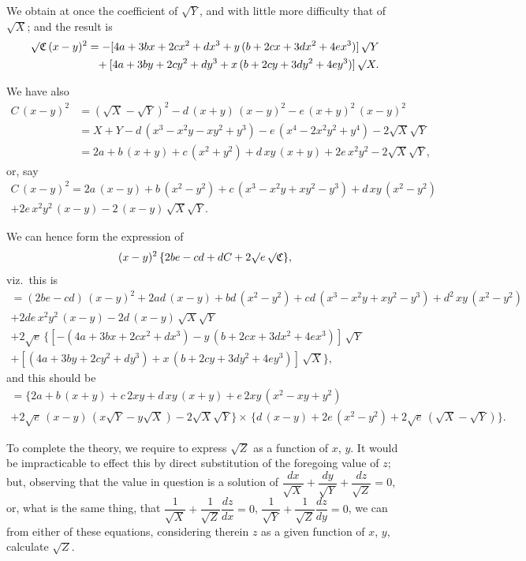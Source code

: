 \documentclass[11pt,a4paper]{book}
\begin{document}
We obtain at once the coefficient of $\surd Y$, and with little more difficulty that of $\surd X$; and the result is
\begin{align*}
\surd\mathfrak{C}\,(x-y)^2 &= -[4a + 3bx + 2cx^2 + dx^3 + y\,(b+2cx+3dx^2+4ex^3)]\,\surd Y \\
&\phantom{=} + [4a + 3by + 2cy^2 + dy^3 + x\,(b+2cy+3dy^2+4ey^3)]\,\surd X.
\end{align*}

\newpage

\noindent
We have also
\begin{align*}
C\,(x-y)^2 &= (\surd X - \surd Y)^2 - d\,(x+y)\,(x-y)^2 - e\,(x+y)^2\,(x-y)^2 \\
&= X + Y - d\,(x^3-x^2y-xy^2+y^3) - e\,(x^4-2x^2y^2+y^4) - 2\surd X\surd Y \\
&= 2a + b\,(x+y) + c\,(x^2+y^2) + d\,xy\,(x+y) + 2e\,x^2y^2 - 2\surd X\surd Y,
\end{align*}
or, say
\begin{multline*}
C\,(x-y)^2 = 2a\,(x-y) + b\,(x^2-y^2) + c\,(x^3-x^2y+xy^2-y^3) + d\,xy\,(x^2-y^2) \\ + 2e\,x^2y^2\,(x-y) - 2\,(x-y)\,\surd X\surd Y.
\end{multline*}

We can hence form the expression of
\[
(x-y)^2\,\{2be - cd + dC + 2\surd e\,\surd\mathfrak{C}\},
\]
viz.\ this is
\begin{multline*}
= (2be-cd)\,(x-y)^2 + 2ad\,(x-y) + bd\,(x^2-y^2) + cd\,(x^3-x^2y+xy^2-y^3) + d^2\,xy\,(x^2-y^2) \\ + 2de\,x^2y^2\,(x-y) - 2d\,(x-y)\,\surd X\surd Y \\
+ 2\surd e\,\{[-(4a+3bx+2cx^2+dx^3) - y\,(b+2cx+3dx^2+4ex^3)]\,\surd Y \\
+ [(4a+3by+2cy^2+dy^3) + x\,(b+2cy+3dy^2+4ey^3)]\,\surd X\},
\end{multline*}
and this should be
\begin{multline*}
= \{2a+b\,(x+y)+c\,2xy+d\,xy\,(x+y)+e\,2xy\,(x^2-xy+y^2) \\
+ 2\surd e\,(x-y)\,(x\surd Y-y\surd X) - 2\surd X\surd Y\} \times\,\{d\,(x-y)+2e\,(x^2-y^2)+2\surd e\,(\surd X-\surd Y)\}.
\end{multline*}

To complete the theory, we require to express $\surd Z$ as a function of $x$, $y$. It would be impracticable to effect this by direct substitution of the foregoing value of $z$; but, observing that the value in question is a solution of $\dfrac{dx}{\surd X} + \dfrac{dy}{\surd Y} + \dfrac{dz}{\surd Z} = 0$, or, what is the same thing, that $\dfrac{1}{\surd X} + \dfrac{1}{\surd Z}\dfrac{dz}{dx} = 0$, $\dfrac{1}{\surd Y} + \dfrac{1}{\surd Z}\dfrac{dz}{dy} = 0$, we can from either of these equations, considering therein $z$ as a given function of $x$, $y$, calculate $\surd Z$.
\end{document}
